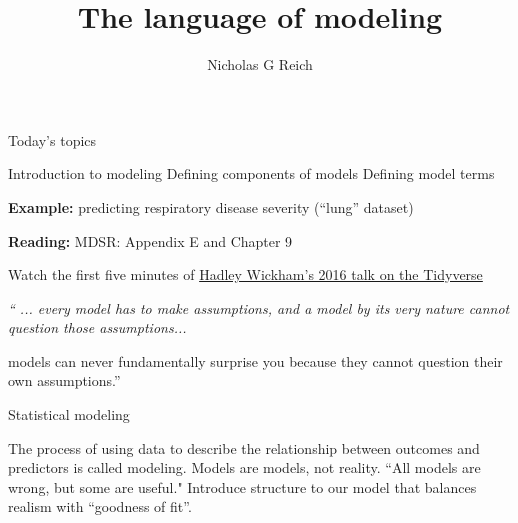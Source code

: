\documentclass[table]{beamer}\usepackage[]{graphicx}\usepackage[]{color}
\title{The language of modeling}
\author{Nicholas G Reich}
\begin{document}
\begin{frame}[plain]
	\titlepage
\end{frame}











\begin{frame}{Today's topics}

\bi
    \myitem Introduction to modeling
    \myitem Defining components of models
    \myitem Defining model terms
\ei

\bigskip

{\bf Example:} predicting respiratory disease severity (``lung'' dataset)

\bigskip

{\bf Reading:} MDSR: Appendix E and Chapter 9


\end{frame}


\begin{frame}%

 Watch the first five minutes of \href{https://www.youtube.com/watch?v=K-ss_ag2k9E}{Hadley Wickham's 2016 talk on the Tidyverse}

\vspace{1cm}

\centering
\em
  `` ... every model has to make assumptions, and a model by its very nature cannot question those assumptions...

\vspace{1cm}

 models can never fundamentally surprise you because they cannot question their own assumptions.'' %


\end{frame}


\begin{frame}{Statistical modeling}

The process of using data to describe the relationship between outcomes and predictors is called modeling.
\bi
  \myitem Models are models, not reality.
  \myitem ``All models are wrong, but some are useful."
  \myitem Introduce structure to our model that balances realism with ``goodness of fit''.
\ei

\end{frame}
\end{document}
